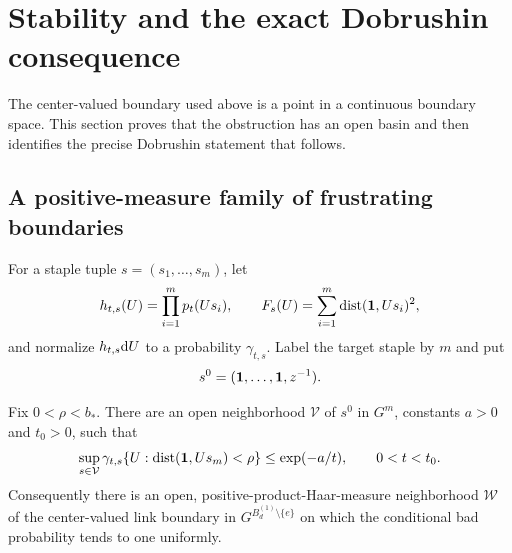 \section{Stability and the exact Dobrushin consequence}
\label{sec:stability-dobrushin}

The center-valued boundary used above is a point in a continuous boundary
space.  This section proves that the obstruction has an open basin and then
identifies the precise Dobrushin statement that follows.

\subsection{A positive-measure family of frustrating boundaries}

For a staple tuple $s=(s_1,\ldots,s_m)$, let
\[
  h_{t,s}(U)=\prod_{i=1}^m p_t(Us_i),
  \qquad
  F_s(U)=\sum_{i=1}^m\operatorname{dist}(\mathbf 1,Us_i)^2,
\]
and normalize $h_{t,s}\mathrm dU$ to a probability $\gamma_{t,s}$.  Label the
target staple by $m$ and put
\[
 s^0=(\mathbf 1,\ldots,\mathbf 1,z^{-1}).
\]

\begin{theorem}\label{thm:open-stability}
Fix $0<\rho<b_*$.  There are an open neighborhood
$\mathcal V$ of $s^0$ in $G^m$, constants $a>0$ and $t_0>0$, such that
\begin{equation}\label{eq:uniform-stability}
 \sup_{s\in\mathcal V}\gamma_{t,s}
 \{U:\operatorname{dist}(\mathbf 1,Us_m)<\rho\}
 \leq \exp(-a/t),
 \qquad 0<t<t_0.
\end{equation}
Consequently there is an open, positive-product-Haar-measure neighborhood
$\mathcal W$ of the center-valued link boundary in
$G^{B_d^{(1)}\setminus\{e\}}$ on which the conditional bad probability tends
to one uniformly.
\end{theorem}

